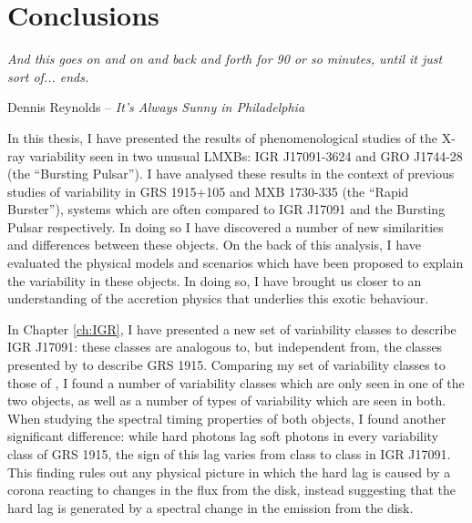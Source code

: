 \chapter{Conclusions}

\epigraph{\textit{And this goes on and on and back and forth for 90 or so minutes, until it just sort of... ends.}}{Dennis Reynolds -- \textit{It's Always Sunny in Philadelphia}}

\vspace{1cm}


\par\noindent In this thesis, I have presented the results of phenomenological studies of the X-ray variability seen in two unusual LMXBs: IGR J17091-3624 and GRO J1744-28 (the ``Bursting Pulsar'').  I have analysed these results in the context of previous studies of variability in GRS 1915+105 and MXB 1730-335 (the ``Rapid Burster''), systems which are often compared to IGR J17091 and the Bursting Pulsar respectively.  In doing so I have discovered a number of new similarities and differences between these objects.  On the back of this analysis, I have evaluated the physical models and scenarios which have been proposed to explain the variability in these objects.  In doing so, I have brought us closer to an understanding of the accretion physics that underlies this exotic behaviour.
\par In Chapter \ref{ch:IGR}, I have presented a new set of variability classes to describe IGR J17091: these classes are analogous to, but independent from, the classes presented by \citet{Belloni_GRS_MI} to describe GRS 1915.  Comparing my set of variability classes to those of \citeauthor{Belloni_GRS_MI}, I found a number of variability classes which are only seen in one of the two objects, as well as a number of types of variability which are seen in both.  When studying the spectral timing properties of both objects, I found another significant difference: while hard photons lag soft photons in every variability class of GRS 1915, the sign of this lag varies from class to class in IGR J17091.  This finding rules out any physical picture in which the hard lag is caused by a corona reacting to changes in the flux from the disk, instead suggesting that the hard lag is generated by a spectral change in the emission from the disk.
